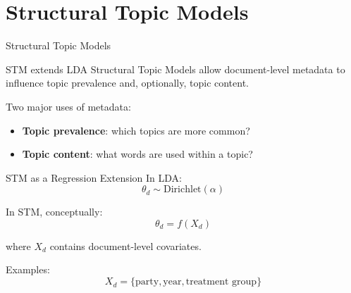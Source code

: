 \documentclass[aspectratio=169]{beamer}
\begin{document}
\section{Structural Topic Models}

\begin{frame}{Structural Topic Models}
\begin{block}{STM extends LDA}
Structural Topic Models allow document-level metadata to influence topic prevalence and, optionally, topic content.
\end{block}

\vspace{0.3cm}
Two major uses of metadata:
\begin{itemize}
  \item \textbf{Topic prevalence}: which topics are more common?
  \item \textbf{Topic content}: what words are used within a topic?
\end{itemize}
\end{frame}

\begin{frame}{STM as a Regression Extension}
In LDA:
\[
\theta_d \sim \text{Dirichlet}(\alpha)
\]

In STM, conceptually:
\[
\theta_d = f(X_d)
\]

where $X_d$ contains document-level covariates.

\vspace{0.4cm}
Examples:
\[
X_d = \{\text{party}, \text{year}, \text{treatment group}\}
\]
\end{frame}
\end{document}
